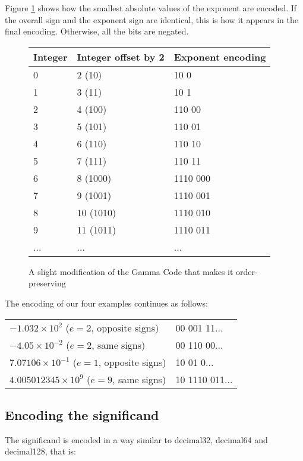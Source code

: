 \documentclass{acm_proc_article-sp}
\begin{document}
Figure \ref{figure-exponent-encoding} shows how the smallest absolute values of the exponent are encoded. If the overall sign and the exponent sign are identical, this is how it appears in the final encoding. Otherwise, all the bits are negated.

\begin{figure}
\caption{A slight modification of the Gamma Code that makes it order-preserving}
\label{figure-exponent-encoding}
\center
\begin{tabular}{|l|l|l|}
\hline
Integer & Integer offset by 2 & Exponent encoding\\
\hline
0 & 2 (10) & 10 0 \\
\hline
1 & 3 (11) & 10 1  \\
\hline
2 & 4 (100) & 110 00  \\
\hline
3 & 5 (101) & 110 01 \\
\hline
4 & 6 (110) & 110 10 \\
\hline
5 & 7 (111) & 110 11 \\
\hline
6 & 8 (1000) & 1110 000 \\
\hline
7 & 9 (1001) & 1110 001 \\
\hline
8 & 10 (1010) & 1110 010 \\
\hline
9 & 11 (1011) & 1110 011 \\
\hline
... & ... & ...\\
\hline
\end{tabular}
\end{figure}

The encoding of our four examples continues as follows:

\begin{tabular}{l|l}
$- 1.032 \times 10^2$ ($e=2$, opposite signs) & 00 001 11... \\

$-4.05 \times 10^{-2}$ ($e=2$, same signs) & 00 110 00... \\

$7.07106 \times 10^{-1}$ ($e=1$, opposite signs) & 10 01 0... \\

$4.005012345 \times 10^9$ ($e=9$, same signs) & 10 1110 011...\\
\end{tabular}


\subsection{Encoding the significand}

The significand is encoded in a way similar to decimal32, decimal64 and decimal128, that is:
\end{document}
